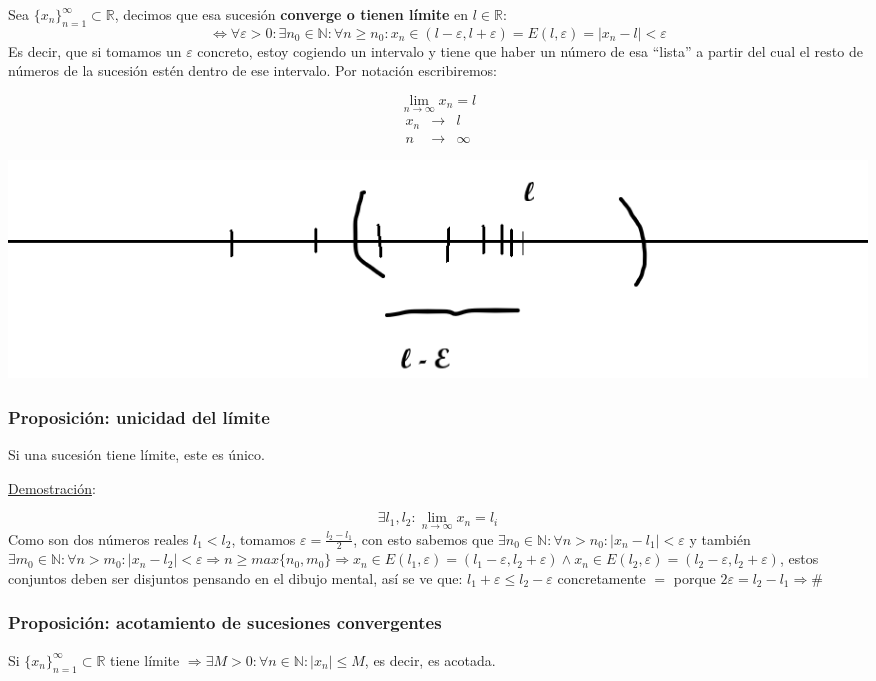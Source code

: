 \documentclass[10pt,a4paper,openright]{book}
\begin{document}
Sea $\{x_n\}_{n=1}^{\infty}\subset \mathbb R$, decimos que esa sucesión \textbf{converge o tienen límite} en $l\in \mathbb R$:
$$\Leftrightarrow \forall \varepsilon>0: \exists n_0\in \mathbb N : \forall n\geq n_0: x_n\in (l-\varepsilon, l+\varepsilon)= E(l,\varepsilon)=|x_n-l|<\varepsilon$$
Es decir, que si tomamos un $\varepsilon$ concreto, estoy cogiendo un intervalo y tiene que haber un número de esa ``lista'' a partir del cual el resto de números de la sucesión estén dentro de ese intervalo. Por notación escribiremos:
\begin{multicols}{2}
$$\lim_{n\rightarrow \infty} x_n=l$$
\begin{eqnarray*}
x_n &\longrightarrow& l \\
n &\rightarrow& \infty
\end{eqnarray*}
\end{multicols}

\begin{center}
\includegraphics[scale=0.35]{convergente}
\end{center}

\subsubsection*{Proposición: unicidad del límite}
Si una sucesión tiene límite, este es único.\par
\underline{Demostración}:\par
$$\exists l_1,l_2: \lim_{n\rightarrow \infty}x_n=l_i$$
Como son dos números reales $l_1<l_2$, tomamos $\varepsilon=\frac{l_2-l_1}{2}$, con esto sabemos que $\exists n_0\in \mathbb N: \forall n>n_0: |x_n-l_1|<\varepsilon$ y también $\exists m_0\in \mathbb N: \forall n>m_0: |x_n-l_2|<\varepsilon\Rightarrow n\geq max\{n_0,m_0\}\Rightarrow x_n\in E(l_1,\varepsilon)=(l_1-\varepsilon, l_2+\varepsilon)\wedge x_n\in E(l_2, \varepsilon)=(l_2-\varepsilon, l_2+\varepsilon)$, estos conjuntos deben ser disjuntos pensando en el dibujo mental, así se ve que: $l_1+\varepsilon\leq l_2-\varepsilon$ concretamente $=$ porque $2\varepsilon=l_2-l_1\Rightarrow \#$

\subsubsection*{Proposición: acotamiento de sucesiones convergentes}
Si $\{x_n\}_{n=1}^{\infty}\subset \mathbb R$ tiene límite $\Rightarrow \exists M>0: \forall n\in \mathbb N: |x_n|\leq M$, es decir, es acotada.\par
\end{document}

